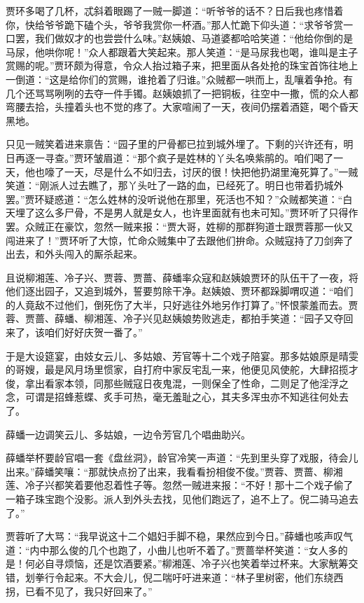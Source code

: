 \documentclass[12pt,oneside]{book}
\begin{document}
贾环多喝了几杯，忒斜着眼踢了一贼一脚道：“听爷爷的话不？日后我也疼惜着你，快给爷爷跪下磕个头，爷爷我赏你一杯酒。”那人忙跪下仰头道：“求爷爷赏一口罢，我们做奴才的也尝尝什么味。”赵姨娘、马道婆都哈哈笑道：“他给你倒的是马尿，他哄你呢！”众人都跟着大笑起来。那人笑道：“是马尿我也喝，谁叫是主子赏赐的呢。”贾环颇为得意，令众人抬过箱子来，把里面从各处抢的珠宝首饰往地上一倒道：“这是给你们的赏赐，谁抢着了归谁。”众贼都一哄而上，乱嚷着争抢。有几个还骂骂咧咧的去夺一件手镯。赵姨娘抓了一把铜板，往空中一撒，慌的众人都弯腰去拾，头撞着头也不觉的疼了。大家喧闹了一天，夜间仍摆着酒筵，喝个昏天黑地。

只见一贼笑着进来禀告：“园子里的尸骨都已拉到城外埋了。下剩的兴许还有，明日再逐一寻查。”贾环皱眉道：“那个疯子是姓林的丫头名唤紫鹃的。咱们喝了一天，他也嚎了一天，尽是什么不如归去，讨厌的很！快把他扔湖里淹死算了。”一贼笑道：“刚派人过去瞧了，那丫头吐了一路的血，已经死了。明日也带着扔城外罢。”贾环疑惑道：“怎么姓林的没听说他在那里，死活也不知？”众贼都笑道：“白天埋了这么多尸骨，不是男人就是女人，也许里面就有也未可知。”贾环听了只得作罢。众贼正在豪饮，忽然一贼来报：“贾大哥，姓柳的那群狗道士跟贾蓉那一伙又闯进来了！”贾环听了大惊，忙命众贼集中了去跟他们拚命。众贼寇持了刀剑奔了出去，和外头闯入的厮杀起来。

且说柳湘莲、冷子兴、贾蓉、贾蔷、薛蟠率众寇和赵姨娘贾环的队伍干了一夜，将他们逐出园子，又追到城外，誓要剪除干净。赵姨娘、贾环都跺脚喟叹道：“咱们的人竟敌不过他们，倒死伤了大半，只好逃往外地另作打算了。”怀恨蒙羞而去。贾蓉、贾蔷、薛蟠、柳湘莲、冷子兴见赵姨娘势败逃走，都拍手笑道：“园子又夺回来了，该咱们好好庆贺一番了。”

于是大设筵宴，由妓女云儿、多姑娘、芳官等十二个戏子陪宴。那多姑娘原是晴雯的哥嫂，最是风月场里惯家，自打府中家反宅乱一来，他便见风使舵，大肆招揽才俊，拿出看家本领，同那些贼寇日夜鬼混，一则保全了性命，二则足了他淫浮之念，可谓是招蜂惹蝶、炙手可热，毫无羞耻之心，其夫多浑虫亦不知逃往何处去了。

薛蟠一边调笑云儿、多姑娘，一边令芳官几个唱曲助兴。

薛蟠举杯要龄官唱一套《盘丝洞》，龄官冷笑一声道：“先到里头穿了戏服，待会儿出来。”薛蟠笑嚷：“那就快点扮了出来，我看看扮相俊不俊。”贾蓉、贾蔷、柳湘莲、冷子兴都笑着要他忍着性子等。忽然一贼进来报：“不好！那十二个戏子偷了一箱子珠宝跑个没影。派人到外头去找，见他们跑远了，追不上了。倪二骑马追去了。”

贾蓉听了大骂：“我早说这十二个娼妇手脚不稳，果然应到今日。”薛蟠也咳声叹气道：“内中那么俊的几个也跑了，小曲儿也听不着了。”贾蔷举杯笑道：“女人多的是！何必自寻烦恼，还是饮酒要紧。”柳湘莲、冷子兴也笑着举过杯来。大家觥筹交错，划拳行令起来。不大会儿，倪二喘吁吁进来道：“林子里树密，他们东绕西拐，已看不见了，我只好回来了。”
\end{document}
